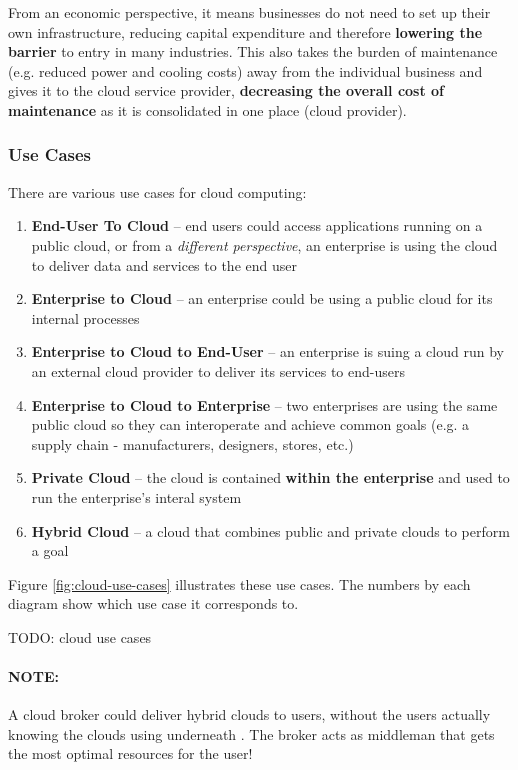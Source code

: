 \documentclass{article}
\begin{document}
From an economic perspective, it means businesses do not need to set up their own infrastructure, reducing capital expenditure and therefore \textbf{lowering the barrier} to entry in many industries. This also takes the burden of maintenance (e.g. reduced power and cooling costs) away from the individual business and gives it to the cloud service provider, \textbf{decreasing the overall cost of maintenance} as it is consolidated in one place (cloud provider).

\subsubsection{Use Cases}

There are various use cases for cloud computing:
\begin{enumerate}
	\item \textbf{End-User To Cloud} -- end users could access applications running on a public cloud, or from a \textit{different perspective}, an enterprise is using the cloud to deliver data and services to the end user
	\item \textbf{Enterprise to Cloud} -- an enterprise could be using a public cloud for its internal processes
	\item \textbf{Enterprise to Cloud to End-User} -- an enterprise is suing a cloud run by an external cloud provider to deliver its services to end-users
	\item \textbf{Enterprise to Cloud to Enterprise} -- two enterprises are using the same public cloud so they can interoperate and achieve common goals (e.g. a supply chain - manufacturers, designers, stores, etc.)
	\item \textbf{Private Cloud} -- the cloud is contained \textbf{within the enterprise} and used to run the enterprise's interal system
	\item \textbf{Hybrid Cloud} -- a cloud that combines public and private clouds to perform a goal
\end{enumerate}
Figure \ref{fig:cloud-use-cases} illustrates these use cases. The numbers by each diagram show which use case it corresponds to.

TODO: cloud use cases

\paragraph{\textbf{NOTE: }} A cloud broker could deliver hybrid clouds to users, without the users actually knowing the clouds using underneath . The broker acts as middleman that gets the most optimal resources for the user!
\end{document}
